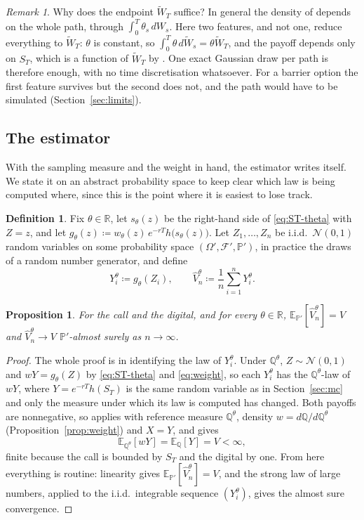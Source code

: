 \documentclass[11pt,a4paper]{article}
\theoremstyle{plain}
\newtheorem{proposition}[theorem]{Proposition}
\theoremstyle{definition}
\newtheorem{definition}[theorem]{Definition}
\theoremstyle{remark}
\newtheorem{remark}[theorem]{Remark}
\newcommand{\R}{\mathbb{R}}
\newcommand{\E}{\mathbb{E}}
\newcommand{\PP}{\mathbb{P}}
\newcommand{\Q}{\mathbb{Q}}
\newcommand{\F}{\mathcal{F}}
\newcommand{\1}{\mathbf{1}}
\newcommand{\eqdef}{\coloneqq}
\newcommand{\Wt}{\widetilde{W}}
\newcommand{\Qt}{\Q^{\theta}}
\begin{document}
\begin{remark}\label{rem:endpoint}
Why does the endpoint $\Wt_T$ suffice? In general the density of \cite[Thm~4.20]{tfg} depends on the whole path, through $\int_0^T \theta_s\, dW_s$. Here two features, and not one, reduce everything to $\Wt_T$: $\theta$ is constant, so $\int_0^T \theta\, d\Wt_s = \theta\Wt_T$, and the payoff depends only on $S_T$, which is a function of $\Wt_T$ by \cite[(5.26)]{tfg}. One exact Gaussian draw per path is therefore enough, with no time discretisation whatsoever. For a barrier option the first feature survives but the second does not, and the path would have to be simulated (Section~\ref{sec:limits}).
\end{remark}

\subsection{The estimator}

With the sampling measure and the weight in hand, the estimator writes itself. We state it on an abstract probability space to keep clear which law is being computed where, since this is the point where it is easiest to lose track.

\begin{definition}\label{def:is}
Fix $\theta \in \R$, let $s_\theta(z)$ be the right-hand side of \eqref{eq:ST-theta} with $Z = z$, and let $g_\theta(z) \eqdef w_\theta(z)\, e^{-rT} h\bigl(s_\theta(z)\bigr)$. Let $Z_1, \dots, Z_n$ be i.i.d.\ $\mathcal N(0,1)$ random variables on some probability space $(\Omega', \F', \PP')$, in practice the draws of a random number generator, and define
\begin{equation}\label{eq:is-estimator}
  Y_i^\theta \eqdef g_\theta(Z_i),
  \qquad
  \hat V_n^\theta \eqdef \frac1n \sum_{i=1}^n Y_i^\theta .
\end{equation}
\end{definition}

\begin{proposition}\label{prop:unbiased}
For the call and the digital, and for every $\theta \in \R$, $\E_{\PP'}[\hat V_n^\theta] = V$ and $\hat V_n^\theta \to V$ $\PP'$-almost surely as $n \to \infty$.
\end{proposition}

\begin{proof}
The whole proof is in identifying the law of $Y_i^\theta$. Under $\Qt$, $Z \sim \mathcal N(0,1)$ and $wY = g_\theta(Z)$ by \eqref{eq:ST-theta} and \eqref{eq:weight}, so each $Y_i^\theta$ has the $\Qt$-law of $wY$, where $Y = e^{-rT}h(S_T)$ is the same random variable as in Section~\ref{sec:mc} and only the measure under which its law is computed has changed. Both payoffs are nonnegative, so \cite[(4.24)]{tfg} applies with reference measure $\Qt$, density $w = d\Q/d\Qt$ (Proposition~\ref{prop:weight}) and $X = Y$, and gives
\[
  \E_{\Qt}[wY] = \E_\Q[Y] = V < \infty,
\]
finite because the call is bounded by $S_T$ and the digital by one. From here everything is routine: linearity gives $\E_{\PP'}[\hat V_n^\theta] = V$, and the strong law of large numbers, applied to the i.i.d.\ integrable sequence $(Y_i^\theta)$, gives the almost sure convergence.
\end{proof}
\end{document}
